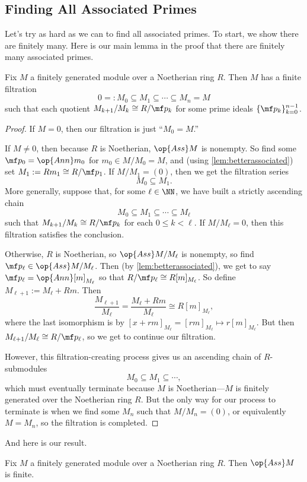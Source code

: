 \subsection{Finding All Associated Primes}
Let's try as hard as we can to find all associated primes. To start, we show there are finitely many. Here is our main lemma in the proof that there are finitely many associated primes.
\begin{lemma} \label{lem:fingenfiltration}
	Fix $M$ a finitely generated module over a Noetherian ring $R$. Then $M$ has a finite filtration
	\[0=:M_0\subseteq M_1\subseteq\cdots\subseteq M_n=M\]
	such that each quotient $M_{k+1}/M_k\cong R/\mf p_k$ for some prime ideals $\{\mf p_k\}_{k=0}^{n-1}$.
\end{lemma}
\begin{proof}
	If $M=0$, then our filtration is just ``$M_0=M$.''
	
	If $M\ne0$, then because $R$ is Noetherian, $\op{Ass}M$ is nonempty. So find some $\mf p_0=\op{Ann}m_0$ for $m_0\in M/M_0=M$, and (using \autoref{lem:betterassociated}) set $M_1:=Rm_1\cong R/\mf p_1$. If $M/M_1=(0)$, then we get the filtration series
	\[M_0\subseteq M_1.\]
	More generally, suppose that, for some $\ell\in\NN$, we have built a strictly ascending chain
	\[M_0\subseteq M_1\subseteq\cdots\subseteq M_\ell\]
	such that $M_{k+1}/M_k\cong R/\mf p_k$ for each $0\le k<\ell$. If $M/M_\ell=0$, then this filtration satisfies the conclusion.
	
	Otherwise, $R$ is Noetherian, so $\op{Ass}M/M_\ell$ is nonempty, so find $\mf p_\ell\in\op{Ass}M/M_\ell$. Then (by \autoref{lem:betterassociated}), we get to say $\mf p_\ell=\op{Ann}[m]_{M_\ell}$ so that $R/\mf p_\ell\cong R[m]_{M_\ell}$. So define $M_{\ell+1}:=M_\ell+Rm$. Then
	\[\frac{M_{\ell+1}}{M_\ell}=\frac{M_\ell+Rm}{M_\ell}\cong R[m]_{M_\ell},\]
	where the last isomorphism is by $[x+rm]_{M_\ell}=[rm]_{M_\ell}\mapsto r[m]_{M_{\ell}}$. But then $M_{\ell+1}/M_\ell\cong R/\mf p_\ell$, so we get to continue our filtration.
	
	However, this filtration-creating process gives us an ascending chain of $R$-submodules
	\[M_0\subseteq M_1\subseteq\cdots,\]
	which must eventually terminate because $M$ is Noetherian---$M$ is finitely generated over the Noetherian ring $R$. But the only way for our process to terminate is when we find some $M_n$ such that $M/M_n=(0)$, or equivalently $M=M_n$, so the filtration is completed.
\end{proof}
And here is our result.
\begin{theorem} \label{thm:finass}
	Fix $M$ a finitely generated module over a Noetherian ring $R$. Then $\op{Ass}M$ is finite.
\end{theorem}

